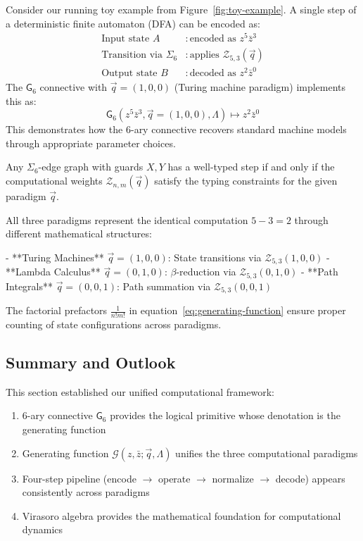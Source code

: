 \begin{example}
\label{ex:dfa-reduction}
Consider our running toy example from Figure~\ref{fig:toy-example}. A single step of a deterministic finite automaton (DFA) can be encoded as:
\begin{align}
\text{Input state } A &: \text{encoded as } z^5 \bar{z}^3 \\
\text{Transition via } \Sigma_6 &: \text{applies } \mathcal{Z}_{5,3}(\vec{q}) \\
\text{Output state } B &: \text{decoded as } z^2 \bar{z}^0
\end{align}
The $\mathsf{G}_6$ connective with $\vec{q} = (1,0,0)$ (Turing machine paradigm) implements this as:
\[
\mathsf{G}_6(z^5\bar{z}^3, \vec{q}=(1,0,0), \Lambda) \mapsto z^2\bar{z}^0
\]
This demonstrates how the 6-ary connective recovers standard machine models through appropriate parameter choices.
\end{example}

\begin{lemma}
\label{lem:well-typed-steps}
Any $\Sigma_6$-edge graph with guards $X,Y$ has a well-typed step if and only if the computational weights $\mathcal{Z}_{n,m}(\vec{q})$ satisfy the typing constraints for the given paradigm $\vec{q}$.
\end{lemma}

All three paradigms represent the identical computation $5-3=2$ through different mathematical structures:

- **Turing Machines** $\vec{q} = (1,0,0)$: State transitions via $\mathcal{Z}_{5,3}(1,0,0)$
- **Lambda Calculus** $\vec{q} = (0,1,0)$: $\beta$-reduction via $\mathcal{Z}_{5,3}(0,1,0)$  
- **Path Integrals** $\vec{q} = (0,0,1)$: Path summation via $\mathcal{Z}_{5,3}(0,0,1)$

The factorial prefactors $\frac{1}{n!m!}$ in equation~\eqref{eq:generating-function} ensure proper counting of state configurations across paradigms.

\subsection{Summary and Outlook}

This section established our unified computational framework:

\begin{enumerate}
\item 6-ary connective $\mathsf{G}_6$ provides the logical primitive whose denotation is the generating function
\item Generating function $\mathcal{G}(z, \bar{z}; \vec{q}, \Lambda)$ unifies the three computational paradigms
\item Four-step pipeline (encode $\to$ operate $\to$ normalize $\to$ decode) appears consistently across paradigms
\item Virasoro algebra provides the mathematical foundation for computational dynamics
\end{enumerate}

